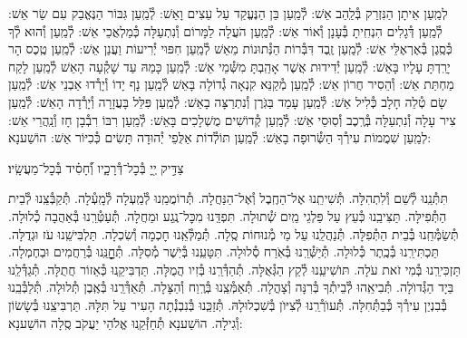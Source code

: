 \documentclass[twoside, openany, parskip=half, 11pt]{book}
\begin{document}
לְמַֽעַן אֵיתָן הַנִּזְרַק בְּ֯לַֽהַב אֵשׁ: לְ֯מַֽעַן בֵּן הַנֶּעֱקַד עַל עֵצִים וָאֵשׁ: לְ֯מַֽעַן גִּבּוֹר הַנֶּאֱבַק עִם שַׂר אֵשׁ: לְ֯מַֽעַן דְּ֯גָלִים הִנְחִֽיתָ בְּ֯עָנָן וְ֯אוֹר אֵשׁ: לְ֯מַֽעַן הֹעֲלָה לַמָּרוֹם וְ֯נִתְעַלָּה כְּ֯מַלְאֲכֵי אֵשׁ: לְ֯מַֽעַן וְ֯הוּא לְ֯ךָ כְּ֯סֶֽגֶן בְּ֯אֶרְאֶלֵּי אֵשׁ: לְ֯מַֽעַן זֶֽבֶד דִּבְּ֯רוֹת הַנְּ֯תוּנוֹת מֵאֵשׁ לְ֯מַֽעַן חִפּוּי יְ֯רִיעוֹת וַעֲנַן אֵשׁ: לְ֯מַֽעַן טֶֽכֶס הָר יָרַֽדְתָּ עָלָיו בָּאֵשׁ: לְ֯מַֽעַן יְ֯דִידוּת אֲשֶׁר אָהַֽבְתָּ מִשְּׁ֯מֵי אֵשׁ: לְ֯מַֽעַן כָּמַהּ עַד שָׁקְ֯עָה הָאֵשׁ לְ֯מַֽעַן לָקַח מַחְתַּת אֵשׁ: וְ֯הֵסִיר חֲרוֹן אֵשׁ: לְ֯מַֽעַן מְ֯קַנֵּא קִנְאָה גְ֯דוֹלָה בָּאֵשׁ לְ֯מַֽעַן נָף יָדוֹ וְ֯יָרְ֯דוּ אַבְנֵי אֵשׁ: לְ֯מַֽעַן שָׂם טְ֯לֵה חָלָב כְּ֯לִיל אֵשׁ: לְ֯מַֽעַן עָמַד בַּגֹּֽרֶן וְ֯נִתְרַצָּה בָאֵשׁ: לְ֯מַֽעַן פִּלֵּל בָּעֲזָרָה וְ֯יָרְ֯דָה הָאֵשׁ: לְ֯מַֽעַן צִיר עָלָה וְ֯נִתְעַלָּה בְּ֯רֶֽכֶב וְ֯סֽוּסֵי אֵשׁ: לְ֯מַֽעַן קְ֯דוֹשִׁים מֻשְׁלָכִים בָּאֵשׁ: לְ֯מַֽעַן רִבּוֹ רִבְ֯בָן חָז וְ֯נַֽהֲרֵי אֵשׁ:
לְמַֽעַן שִׁמֲמוֹת עִירְ֯ךָ הַשְּׂ֯רוּפָה בָאֵשׁ:
לְ֯מַֽעַן תּוֹלְ֯דוֹת אַלֻּפֵי יְ֯הוּדָה תָּשִׂים כְּ֯כִיּוֹר אֵשׁ: הוֹשַׁענָא:

צַדִּ֣יק יְ֖יָ בְּ֯כׇל־דְּ֯רָכָ֑יו וְ֯֝חָסִ֗יד בְּ֯כׇל־מַעֲשָֽׂיו׃

תִּתְּ֯נֵֽנוּ לְ֯שֵׁם וְ֯לִתְהִלָּה.
תְּ֯שִׁיתֵֽנוּ אֶל־הַחֶֽבֶל וְ֯אֶל־הַנַּחֲלָה.
תְּ֯רוֹמֲמֵֽנוּ לְ֯מַֽעְלָה לְ֯מָֽעְ֯לָה.
תְּ֯קַבְּ֯צֵֽנוּ לְ֯בֵית הַתְּ֯פִילָּה.
תַּצִּיבֵֽנוּ כְּ֯עֵץ עַל פַּלְגֵי מַֽיִם שְׁ֯תוּלָה.
תִּפְדֵּֽנוּ מִכׇּל־נֶֽגַע וּמַחֲלָה.
תְּ֯עַטְּ֯רֵֽנוּ בְּ֯אַהֲבָה כְ֯לוּלָה.
תְּ֯שַׂמְּ֯חֵֽנוּ בְּ֯בֵית הַתְּ֯פִלָּה.
תְּ֯נַהֲלֵֽנוּ עַל מֵי מְ֯נוּחוֹת סֶֽלָה.
תְּ֯מַלְּ֯אֵֽנוּ חׇכְמָה וְ֯שִׂכְלָה.
תַּלְבִּישֵֽׁנוּ עֹז וּגְדֻלָּה.
תַּכְתִּירֵֽנוּ בְּ֯כֶֽתֶר כְּ֯לוּלָה.
תְּ֯יַשְּׁ֯רֵֽנוּ בְּ֯אֹֽרַח סְ֯לוּלָה.
תִּטָּעֵֽנוּ בְּ֯יֹֽשֶׁר מְ֯סִלָּה.
תְּ֯חׇׇׇׇׇׇׇׇנֵּֽנוּ בְּ֯רַחֲמִים וּבְחֶמְלָה.
תַּזְכִּירֵֽנוּ בְּ֯מִי זֹאת עֹלָה.
תּוׂשִׁיעֵֽנוּ לְ֯קֵץ הַגְּ֯אֻלָּה.
תְּ֯הַדְּ֯רֵֽנוּ בְּ֯זִיו הֲמֻלָּה.
תַּדְבִּיקֵֽנוּ כְּ֯אֵזוֹר חֲתֻלָּה.
תְּ֯גַדְּ֯לֵֽנוּ בַּיָד הַגְּ֯דוׂלָה.
תְּ֯בִיאֵֽהוּ לְ֯בֵיתְ֯ךָ בְּ֯רִנָּה וְ֯צָהֳלָה.
תְּ֯אַמְּ֯צֵֽנוּ בְּ֯רֶֽוַח וְ֯הַצָּלָה.
תְּ֯אַדְּ֯רְֵנוּ בְּ֯אֶֽבֶן תְּ֯לוּלָה.
תְּ֯לַבְּ֯בֵֽנוּ בְּ֯בִנְיַן עִירְ֯ךָ כְּ֯בַתְּ֯חִלָּה.
תְּ֯עוׂרְ֯רֵֽנוּ לְ֯צִיּוׂן בְּ֯שִׁכְלוּלָהּ.
תְּ֯זַכְֵּנוּ בְּ֯נִבְנְ֯תָה הָעִיר עַל תִּלָּהּ.
תַּרְבִּיצֵֽנוּ בְּ֯שָׂשׂוֹן וְ֯גִילָה.
הוֹשַׁענָא תְּ֯חַזְּ֯קֵֽנוּ אֱלֹהֵי יַעֲקֹב סֶֽלָה הוֹשַׁענָא:
\end{document}
